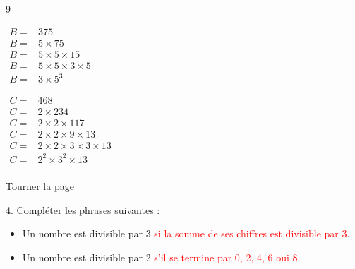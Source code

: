 \documentclass[a4paper]{book}
\begin{document}
{\begin{exerciceNote}{9}
\begin{enumerate}[leftmargin=*]
\begin{minipage}{0.30\linewidth}
            \end{minipage}
            \hfill
            \begin{minipage}{0.30\linewidth}
                $\begin{array}{ll}
                    B = & 375 \\[1ex]
                    B = & 5\times75 \\[1ex]
                    B = & 5\times5\times15 \\[1ex]
                    B = & 5\times5\times3\times5 \\[1ex]
                    B = & 3\times5^3
                \end{array}$    
            \end{minipage}
            \hfill
            \begin{minipage}[t]{0.30\linewidth}
                $\begin{array}{ll}
                    C = & 468 \\[1ex]
                    C = & 2\times234 \\[1ex]
                    C = & 2\times2\times117 \\[1ex]
                    C = & 2\times2\times9\times13 \\[1ex]
                    C = & 2\times2\times3\times3\times13 \\[1ex]
                    C = & 2^2\times3^2\times13 \\[1ex]
                \end{array}$
            \end{minipage}
        \end{enumerate}
    \end{exerciceNote}

    \vfill\hfill Tourner la page


\newpage

    \begin{exercice}
        4. Compléter les phrases suivantes :
        \begin{itemize}
            \item Un nombre est divisible par 3 \textcolor{red}{si la somme de ses chiffres est divisible par 3}.

            \medskip

            \item Un nombre est divisible par 2 \textcolor{red}{s'il se termine par 0, 2, 4, 6 oui 8}.
        \end{itemize}


\end{exercice}}
\end{document}
